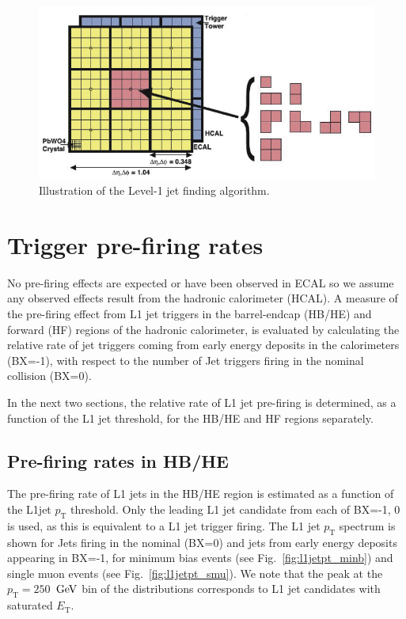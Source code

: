 \documentclass[11pt]{cmspaperpdf}
\newcommand{\GeV}{\ensuremath{\,\text{Ge\hspace{-.08em}V}}\xspace}
\newcommand{\pt}{\ensuremath{p_{\mathrm{T}}}\xspace}
\newcommand{\et}{\ensuremath{E_{\textrm{T}}}\xspace}
\begin{document}
\begin{figure}[h!]
\centering
\includegraphics[scale=1.0]{plots/L1JetAlgorithm.png}
\caption{Illustration of the Level-1 jet finding algorithm.}
\label{fig:l1jetalgo}
\end{figure}
\vspace{5mm}

\section{Trigger pre-firing rates}

No pre-firing effects are expected or have been observed in ECAL so we assume any observed effects result from the hadronic calorimeter (HCAL). A measure of the pre-firing effect from L1 jet triggers in the barrel-endcap (HB/HE) and forward (HF) regions of the hadronic calorimeter, is evaluated by calculating the relative rate of jet triggers coming from early energy deposits in the calorimeters (BX=-1), with respect to the number of Jet triggers firing in the nominal collision (BX=0). 

In the next two sections, the relative rate of L1 jet pre-firing is determined, as a function of the L1 jet threshold, for the HB/HE and HF regions separately.

\subsection{Pre-firing rates in HB/HE}
\label{sec:rates_hbhe}

The pre-firing rate of L1 jets in the HB/HE region is estimated as a function of the L1jet \pt threshold. Only the leading L1 jet candidate from each of BX=-1, 0 is used, as this is equivalent to a L1 jet trigger firing. The L1 jet \pt spectrum is shown for Jets firing in the nominal (BX=0) and jets from early energy deposits appearing in BX=-1, for minimum bias events (see Fig.~\ref{fig:l1jetpt_minb}) and single muon events (see Fig.~\ref{fig:l1jetpt_smu}). We note that the peak at the $\pt=250$ \GeV bin of the distributions corresponds to L1 jet candidates with saturated \et. 
\end{document}
